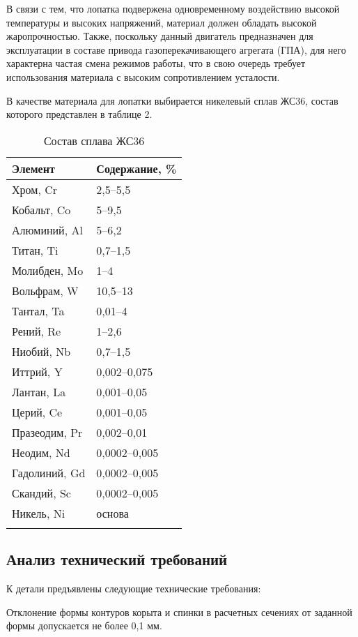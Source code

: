 В связи с тем, что лопатка подвержена одновременному воздействию высокой температуры и высоких напряжений, материал должен обладать высокой жаропрочностью. Также, поскольку данный двигатель предназначен для эксплуатации в составе привода газоперекачивающего агрегата (ГПА), для него характерна частая смена режимов работы, что в свою очередь требует использования материала с высоким сопротивлением усталости.

В качестве материала для лопатки выбирается никелевый сплав ЖС36, состав которого представлен в таблице 2.

\begin{longtable}{|l|l|}
	\hline
	\textbf{Элемент} & \textbf{Содержание, \%} \\ \hline
	\endhead
	Хром, Cr & 2,5–5,5 \\ \hline
	Кобальт, Co & 5–9,5 \\ \hline
	Алюминий, Al & 5–6,2 \\ \hline
	Титан, Ti & 0,7–1,5 \\ \hline
	Молибден, Mo & 1–4 \\ \hline
	Вольфрам, W & 10,5–13 \\ \hline
	Тантал, Ta & 0,01–4 \\ \hline
	Рений, Re & 1–2,6 \\ \hline
	Ниобий, Nb & 0,7–1,5 \\ \hline
	Иттрий, Y & 0,002–0,075 \\ \hline
	Лантан, La & 0,001–0,05 \\ \hline
	Церий, Ce & 0,001–0,05 \\ \hline
	Празеодим, Pr & 0,002–0,01 \\ \hline
	Неодим, Nd & 0,0002–0,005 \\ \hline
	Гадолиний, Gd & 0,0002–0,005 \\ \hline
	Скандий, Sc & 0,0002–0,005 \\ \hline
	Никель, Ni & основа \\ \hline
	\caption{Состав сплава ЖС36} \label{tab:technology-alloy-properties}
\end{longtable}

\subsection{Анализ технический требований}

К детали предъявлены следующие технические требования:

Отклонение формы контуров корыта и спинки в расчетных сечениях от заданной формы допускается не более 0,1 мм.

